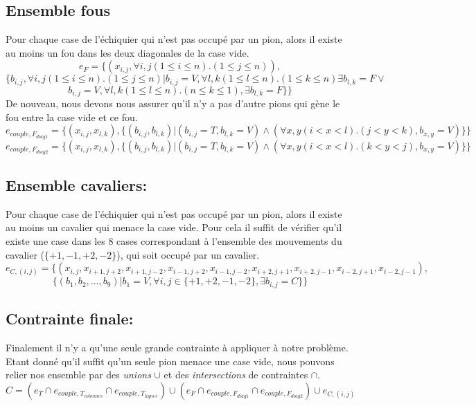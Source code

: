 \documentclass[a4paper,10pt]{article}
\begin{document}
	\subsection{Ensemble fous}
		Pour chaque case de l'échiquier qui n'est pas occupé par un pion, alors il existe au moins un fou dans les deux diagonales de la case vide.
		$$ e_F = \{(x_{i,j}, \forall i,j (1 \leq i \leq n).(1 \leq j \leq n)),$$ $$\{b_{i,j},\forall i,j (1 \leq i \leq n).(1 \leq j \leq n)|b_{i,j} = V, \forall l,k (1 \leq l \leq n).(1 \leq k \leq n) \exists b_{l,k} = F \lor$$ $$b_{i,j} = V, \forall l,k (1 \leq l \leq n).(n \leq k \leq 1), \exists b_{l,k} = F\}\}  $$
			De nouveau, nous devons nous assurer qu'il n'y a pas d'autre pions qui gène le fou entre la case vide et ce fou.
		$$ e_{couple,F_{diag1}} = \{(x_{i,j}, x_{l,k}), \{(b_{i,j}, b_{l,k})|(b_{i,j} = T, b_{l,k} = V) \land ( \forall x,y (i < x < l).(j < y < k), b_{x,y} = V) \}\}$$
		$$ e_{couple,F_{diag2}} = \{(x_{i,j}, x_{l,k}), \{(b_{i,j}, b_{l,k})|(b_{i,j} = T, b_{l,k} = V) \land ( \forall x,y (i < x < l).(k < y < j), b_{x,y} = V) \}\}$$

	\subsection{Ensemble cavaliers:}
			Pour chaque case de l'échiquier qui n'est pas occupé par un pion, alors il existe au moins un cavalier qui menace la case vide. Pour cela il suffit de vérifier qu'il existe une case dans les 8 cases correspondant à l'ensemble des mouvements du cavalier ($\{+1,-1,+2,-2\}$), qui soit occupé par un cavalier.
	$$ e_{C,(i,j)} = \{(x_{i,j}, x_{i+1,j+2}, x_{i+1,j-2}, x_{i-1,j+2}, x_{i-1,j-2}, x_{i+2,j+1}, x_{i+2,j-1}, x_{i-2,j+1}, x_{i-2,j-1}),$$ $$\{(b_1, b_2, \ldots, b_9)|b_1 = V, \forall i,j \in \{+1,+2,-1,-2\}, \exists b_{i,j} = C\}\} $$

	\subsection{Contrainte finale:}
		Finalement il n'y a qu'une seule grande contrainte à appliquer à notre problème. Etant donné qu'il suffit qu'un seule pion menace une case vide, nous pouvons relier nos ensemble par des \emph{unions} $\cup$ et des \emph{intersections} de contraintes $\cap$. 
	$$ C = (e_T \cap e_{couple,T_{colonnes}} \cap e_{couple,T_{lignes}}) \cup (e_F \cap e_{couple,F_{diag1}} \cap e_{couple,F_{diag2}}) \cup e_{C,(i,j)}$$
\end{document}
